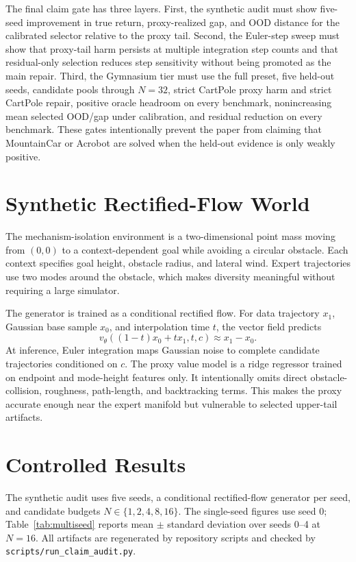 \documentclass[10pt]{article}
\begin{document}
The final claim gate has three layers. First, the synthetic audit must show five-seed improvement in true return, proxy-realized gap, and OOD distance for the calibrated selector relative to the proxy tail. Second, the Euler-step sweep must show that proxy-tail harm persists at multiple integration step counts and that residual-only selection reduces step sensitivity without being promoted as the main repair. Third, the Gymnasium tier must use the full preset, five held-out seeds, candidate pools through \(N=32\), strict CartPole proxy harm and strict CartPole repair, positive oracle headroom on every benchmark, nonincreasing mean selected OOD/gap under calibration, and residual reduction on every benchmark. These gates intentionally prevent the paper from claiming that MountainCar or Acrobot are solved when the held-out evidence is only weakly positive.

\section{Synthetic Rectified-Flow World}

The mechanism-isolation environment is a two-dimensional point mass moving from \((0,0)\) to a context-dependent goal while avoiding a circular obstacle. Each context specifies goal height, obstacle radius, and lateral wind. Expert trajectories use two modes around the obstacle, which makes diversity meaningful without requiring a large simulator.

The generator is trained as a conditional rectified flow. For data trajectory \(x_1\), Gaussian base sample \(x_0\), and interpolation time \(t\), the vector field predicts
\[
v_\theta((1-t)x_0 + t x_1, t, c) \approx x_1 - x_0.
\]
At inference, Euler integration maps Gaussian noise to complete candidate trajectories conditioned on \(c\). The proxy value model is a ridge regressor trained on endpoint and mode-height features only. It intentionally omits direct obstacle-collision, roughness, path-length, and backtracking terms. This makes the proxy accurate enough near the expert manifold but vulnerable to selected upper-tail artifacts.

\section{Controlled Results}

The synthetic audit uses five seeds, a conditional rectified-flow generator per seed, and candidate budgets \(N \in \{1,2,4,8,16\}\). The single-seed figures use seed 0; Table~\ref{tab:multiseed} reports mean \(\pm\) standard deviation over seeds 0--4 at \(N=16\). All artifacts are regenerated by repository scripts and checked by \texttt{scripts/run\_claim\_audit.py}.
\end{document}
